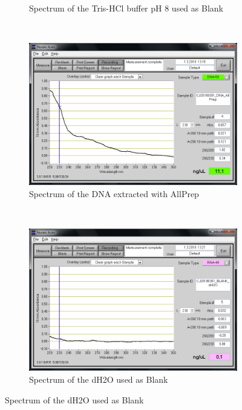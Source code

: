 \begin{figure}[H]
\begin{subfigure}[b]{0.49\textwidth}
        \caption{Spectrum of the Tris-HCl buffer pH 8 used as Blank}
        \label{sfig:CJ20180301_BLANK_TrisHCl_pH8}
    \end{subfigure}
    ~ 
    \begin{subfigure}[b]{0.49\textwidth}
        \includegraphics[width=\textwidth]{graphics/screenshots/CJ20180301_DNA_AllPrep.png}
        \caption{Spectrum of the DNA extracted with AllPrep}
        \label{sfig:CJ20180301_DNA_AllPrep}
    \end{subfigure}
    \\
    \begin{subfigure}[b]{0.49\textwidth}
        \includegraphics[width=\textwidth]{graphics/screenshots/CJ20180301_BLANK_dH2O.png}
        \caption{Spectrum of the dH2O used as Blank}
        \label{sfig:CJ20180301_BLANK_dH2O}
    \end{subfigure}

\end{figure}
